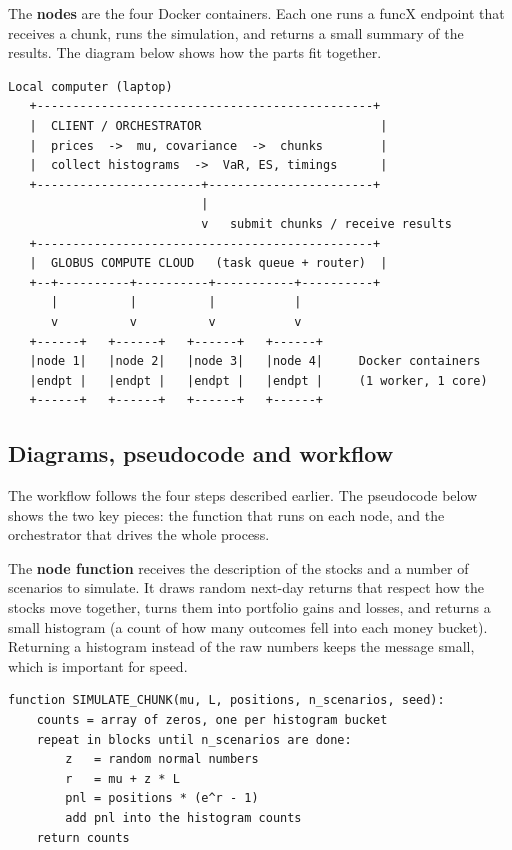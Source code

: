 \documentclass[11pt,a4paper]{article}
\begin{document}
The \textbf{nodes} are the four Docker containers. Each one runs a funcX endpoint that receives a chunk, runs the simulation, and returns a small summary of the results. The diagram below shows how the parts fit together.

\begin{lstlisting}[style=plain,aboveskip=8pt,belowskip=8pt]
   Local computer (laptop)
   +-----------------------------------------------+
   |  CLIENT / ORCHESTRATOR                         |
   |  prices  ->  mu, covariance  ->  chunks        |
   |  collect histograms  ->  VaR, ES, timings      |
   +-----------------------+-----------------------+
                           |
                           v   submit chunks / receive results
   +-----------------------------------------------+
   |  GLOBUS COMPUTE CLOUD   (task queue + router)  |
   +--+----------+----------+-----------+----------+
      |          |          |           |
      v          v          v           v
   +------+   +------+   +------+   +------+
   |node 1|   |node 2|   |node 3|   |node 4|     Docker containers
   |endpt |   |endpt |   |endpt |   |endpt |     (1 worker, 1 core)
   +------+   +------+   +------+   +------+
\end{lstlisting}

\subsection{Diagrams, pseudocode and workflow}

The workflow follows the four steps described earlier. The pseudocode below shows the two key pieces: the function that runs on each node, and the orchestrator that drives the whole process.

The \textbf{node function} receives the description of the stocks and a number of scenarios to simulate. It draws random next-day returns that respect how the stocks move together, turns them into portfolio gains and losses, and returns a small histogram (a count of how many outcomes fell into each money bucket). Returning a histogram instead of the raw numbers keeps the message small, which is important for speed.

\begin{lstlisting}[style=plain]
function SIMULATE_CHUNK(mu, L, positions, n_scenarios, seed):
    counts = array of zeros, one per histogram bucket
    repeat in blocks until n_scenarios are done:
        z   = random normal numbers
        r   = mu + z * L
        pnl = positions * (e^r - 1)
        add pnl into the histogram counts
    return counts
\end{lstlisting}
\end{document}

